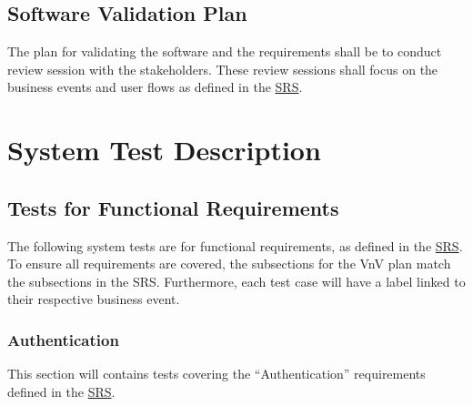 \documentclass[12pt, titlepage]{article}
\begin{document}
\subsection{Software Validation Plan}

The plan for validating the software and the requirements shall be to conduct review session with
the stakeholders. These review sessions shall focus on the business events and user flows as
defined in the \href{https://github.com/arkinmodi/project-sayyara/blob/main/docs/SRS/SRS.pdf}{SRS}.

\section{System Test Description} \label{System Test Description}

\subsection{Tests for Functional Requirements} \label{Tests for Functional Requirements}

The following system tests are for functional requirements, as defined in the
\href{https://github.com/arkinmodi/project-sayyara/blob/main/docs/SRS/SRS.pdf}{SRS}. To ensure all
requirements are covered, the subsections for the VnV plan match the subsections in the SRS.
Furthermore, each test case will have a label linked to their respective business event.



\subsubsection{Authentication}
This section will contains tests covering the ``Authentication'' requirements defined in the
\href{https://github.com/arkinmodi/project-sayyara/blob/main/docs/SRS/SRS.pdf}{SRS}.
\end{document}
